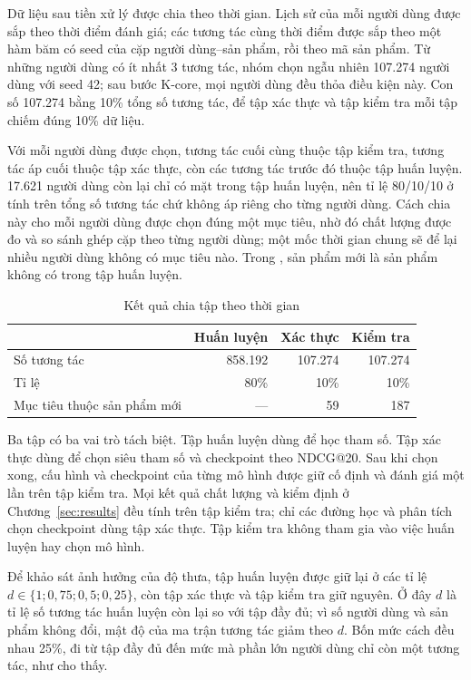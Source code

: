 Dữ liệu sau tiền xử lý được chia theo thời gian. Lịch sử của mỗi người dùng được sắp theo thời điểm đánh giá; các tương tác cùng thời điểm được sắp theo một hàm băm có seed của cặp người dùng--sản phẩm, rồi theo mã sản phẩm. Từ những người dùng có ít nhất 3 tương tác, nhóm chọn ngẫu nhiên 107.274 người dùng với seed 42; sau bước K-core, mọi người dùng đều thỏa điều kiện này. Con số 107.274 bằng 10\% tổng số tương tác, để tập xác thực và tập kiểm tra mỗi tập chiếm đúng 10\% dữ liệu.

Với mỗi người dùng được chọn, tương tác cuối cùng thuộc tập kiểm tra, tương tác áp cuối thuộc tập xác thực, còn các tương tác trước đó thuộc tập huấn luyện. 17.621 người dùng còn lại chỉ có mặt trong tập huấn luyện, nên tỉ lệ 80/10/10 ở  tính trên tổng số tương tác chứ không áp riêng cho từng người dùng. Cách chia này cho mỗi người dùng được chọn đúng một mục tiêu, nhờ đó chất lượng được đo và so sánh ghép cặp theo từng người dùng; một mốc thời gian chung sẽ để lại nhiều người dùng không có mục tiêu nào. Trong , sản phẩm mới là sản phẩm không có trong tập huấn luyện.

\begin{table}[H]
\centering
\begin{tabular}{@{}lrrr@{}}
\toprule
 & Huấn luyện & Xác thực & Kiểm tra \\
\midrule
Số tương tác & 858.192 & 107.274 & 107.274 \\
Tỉ lệ & 80\% & 10\% & 10\% \\
Mục tiêu thuộc sản phẩm mới & --- & 59 & 187 \\
\bottomrule
\end{tabular}
\caption{Kết quả chia tập theo thời gian}
\label{tab:split}
\end{table}

Ba tập có ba vai trò tách biệt. Tập huấn luyện dùng để học tham số. Tập xác thực dùng để chọn siêu tham số và checkpoint theo NDCG@20. Sau khi chọn xong, cấu hình và checkpoint của từng mô hình được giữ cố định và đánh giá một lần trên tập kiểm tra. Mọi kết quả chất lượng và kiểm định ở Chương~\ref{sec:results} đều tính trên tập kiểm tra; chỉ các đường học và phân tích chọn checkpoint dùng tập xác thực. Tập kiểm tra không tham gia vào việc huấn luyện hay chọn mô hình.

\label{sec:sparsity-protocol}

Để khảo sát ảnh hưởng của độ thưa, tập huấn luyện được giữ lại ở các tỉ lệ $d\in\{1;0{,}75;0{,}5;0{,}25\}$, còn tập xác thực và tập kiểm tra giữ nguyên. Ở đây $d$ là tỉ lệ số tương tác huấn luyện còn lại so với tập đầy đủ; vì số người dùng và sản phẩm không đổi, mật độ của ma trận tương tác giảm theo $d$. Bốn mức cách đều nhau 25\%, đi từ tập đầy đủ đến mức mà phần lớn người dùng chỉ còn một tương tác, như  cho thấy.

